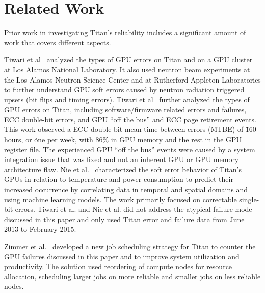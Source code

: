\section{Related Work}
\label{section:related}

Prior work in investigating Titan's reliability includes a significant amount of work that covers different aspects.

Tiwari et al~\cite{7056044} analyzed the types of GPU errors on Titan and on a GPU cluster at Los Alamos National Laboratory. It also used neutron beam experiments at the Los Alamos Neutron Science Center and at Rutherford Appleton Laboratories to further understand GPU soft errors caused by neutron radiation triggered upsets (bit flips and timing errors).
%
Tiwari et al~\cite{10.1145/2807591.2807666} further analyzed the types of GPU errors on Titan, including software/firmware related errors and failures, ECC double-bit errors, and GPU ``off the bus'' and ECC page retirement events. This work observed a ECC double-bit mean-time between errors (MTBE) of \~160 hours, or \~ one per week, with 86\% in GPU memory and the rest in the GPU register file. The experienced GPU ``off the bus'' events were caused by a system integration issue that was fixed and not an inherent GPU or GPU memory architecture flaw.
%
Nie et al.~\cite{7446091,nie17characterizing,nie18machine} characterized the soft error behavior of Titan's GPUs in relation to temperature and power consumption to predict their increased occurrence by correlating data in temporal and spatial domains and using machine learning models. The work primarily focused on correctable single-bit errors.
%
Tiwari et al. and Nie et al. did not address the atypical failure mode discussed in this paper and only used Titan error and failure data from June 2013 to February 2015.

Zimmer et al.~\cite{8665764} developed a new job scheduling strategy for Titan to counter the GPU failures discussed in this paper and to improve system utilization and productivity. The solution used reordering of compute nodes for resource allocation, scheduling larger jobs on more reliable and smaller jobs on less reliable nodes.

